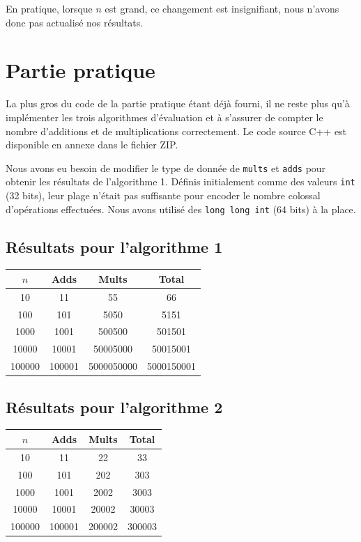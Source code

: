 \documentclass[11pt,a4paper]{article}
\begin{document}
En pratique, lorsque $n$ est grand, ce changement est insignifiant, nous n'avons donc pas actualisé nos résultats.


\section{Partie pratique}

La plus gros du code de la partie pratique étant déjà fourni, il ne reste plus qu'à implémenter les trois algorithmes d'évaluation et à s'assurer de compter le nombre d'additions et de multiplications correctement. Le code source C++ est disponible en annexe dans le fichier ZIP.

Nous avons eu besoin de modifier le type de donnée de \texttt{mults} et \texttt{adds} pour obtenir les résultats de l'algorithme 1. Définis initialement comme des valeurs \texttt{int} (32 bits), leur plage n'était pas suffisante pour encoder le nombre colossal d'opérations effectuées. Nous avons utilisé des \texttt{long long int} (64 bits) à la place.

\subsection{Résultats pour l'algorithme 1}

\begin{center}
\begin{tabular}{ c | c | c | c }
	$n$ & Adds & Mults & Total \\
	\hline                       
	10 & 11 & 55 & 66 \\
	100 & 101 & 5050 & 5151 \\
	1000 & 1001 & 500500 & 501501 \\
	10000 & 10001 & 50005000 & 50015001 \\
	100000 & 100001 & 5000050000 & 5000150001 \\
\end{tabular}
\end{center}

\subsection{Résultats pour l'algorithme 2}

\begin{center}
\begin{tabular}{ c | c | c | c }
	$n$ & Adds & Mults & Total \\
	\hline                       
	10 & 11 & 22 & 33 \\
	100 & 101 & 202 & 303 \\
	1000 & 1001 & 2002 & 3003 \\
	10000 & 10001 & 20002 & 30003 \\
	100000 & 100001 & 200002 & 300003 \\
\end{tabular}
\end{center}
\end{document}
